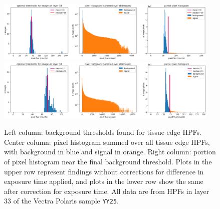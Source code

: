 \documentclass[letterpaper,11pt]{article}
\begin{document}
\begin{figure}[!ht]
\centering
\includegraphics[width=0.95\textwidth]{images/results/thresholding_pre_correction/YY25_layer_33_background_threshold_plots}
\includegraphics[width=0.95\textwidth]{images/results/thresholding_post_correction/YY25_layer_33_background_threshold_plots}
\caption{\footnotesize Left column: background thresholds found for tissue edge HPFs. Center column: pixel histogram summed over all tissue edge HPFs, with background in blue and signal in orange. Right column: portion of pixel histogram near the final background threshold. Plots in the upper row represent findings without corrections for difference in exposure time applied, and plots in the lower row show the same after correction for exposure time. All data are from HPFs in layer 33 of the Vectra Polaris sample \texttt{YY25}.}
\label{fig:background_threshold_impact_polaris_layer_33}
\end{figure}
\end{document}
